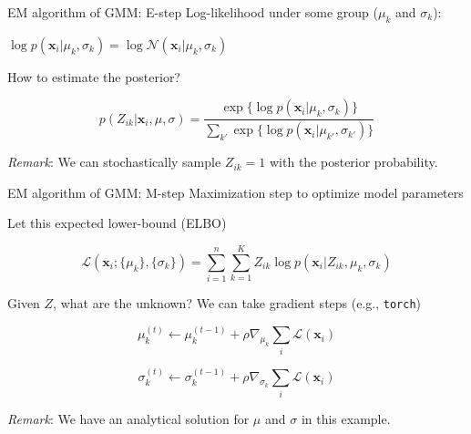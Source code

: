 \documentclass[
  ignorenonframetext,
  aspectratio=169]{beamer}
\begin{document}
\begin{frame}{EM algorithm of GMM: E-step}
\protect\hypertarget{em-algorithm-of-gmm-e-step}{}
Log-likelihood under some group (\(\mu_{k}\) and \(\sigma_{k}\)):

\(\log p(\mathbf{x}_{i}|\mu_{k}, \sigma_{k}) = \log \mathcal{N}\!\left(\mathbf{x}_{i}|\mu_{k},\sigma_{k}\right)\)

\scriptsize

\normalsize

How to estimate the posterior?

\[p(Z_{ik}| \mathbf{x}_{i}, \mu, \sigma)
= \frac{\exp\{\log p(\mathbf{x}_{i}|\mu_{k},\sigma_{k})\}}{\sum_{k'} \exp\{\log p(\mathbf{x}_{i}|\mu_{k'},\sigma_{k'})\}}\]

\scriptsize

\normalsize

\emph{Remark}: We can stochastically sample \(Z_{ik}=1\) with the
posterior probability.
\end{frame}

\begin{frame}[fragile]{EM algorithm of GMM: M-step}
\protect\hypertarget{em-algorithm-of-gmm-m-step}{}
Maximization step to optimize model parameters

Let this expected lower-bound (ELBO)

\[\mathcal{L}(\mathbf{x}_{i}; \{\mu_{k}\}, \{\sigma_{k}\})
=
\sum_{i=1}^{n}\sum_{k=1}^{K} Z_{ik} \log p(\mathbf{x}_{i}| Z_{ik}, \mu_{k}, \sigma_{k})\]

Given \(Z\), what are the unknown? We can take gradient steps (e.g.,
\texttt{torch})

\[\mu_{k}^{(t)} \gets \mu_{k}^{(t-1)} + \rho \nabla_{\mu_{k}} \sum_{i} \mathcal{L}(\mathbf{x}_{i})\]

\[\sigma_{k}^{(t)} \gets \sigma_{k}^{(t-1)} + \rho \nabla_{\sigma_{k}} \sum_{i} \mathcal{L}(\mathbf{x}_{i})\]

\scriptsize

\normalsize

\emph{Remark}: We have an analytical solution for \(\mu\) and \(\sigma\)
in this example.

\scriptsize

\normalsize
\end{frame}
\end{document}
